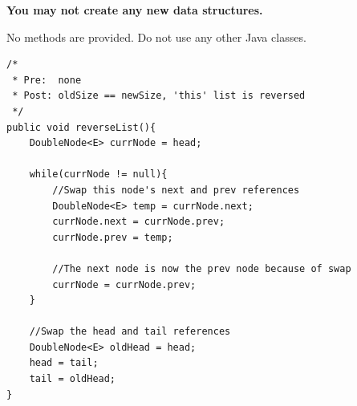 \documentclass[12pt]{article}
\begin{document}
\noindent \textbf{You may not create any new data structures.}

\noindent No methods are provided. Do not use any other Java classes.

\clearpage
\begin{verbatim}
/* 
 * Pre:  none
 * Post: oldSize == newSize, 'this' list is reversed
 */
public void reverseList(){
    DoubleNode<E> currNode = head;

    while(currNode != null){
        //Swap this node's next and prev references
        DoubleNode<E> temp = currNode.next;
        currNode.next = currNode.prev;
        currNode.prev = temp;

        //The next node is now the prev node because of swap
        currNode = currNode.prev;
    }

    //Swap the head and tail references
    DoubleNode<E> oldHead = head;
    head = tail;
    tail = oldHead;
}
\end{verbatim}
\end{document}

